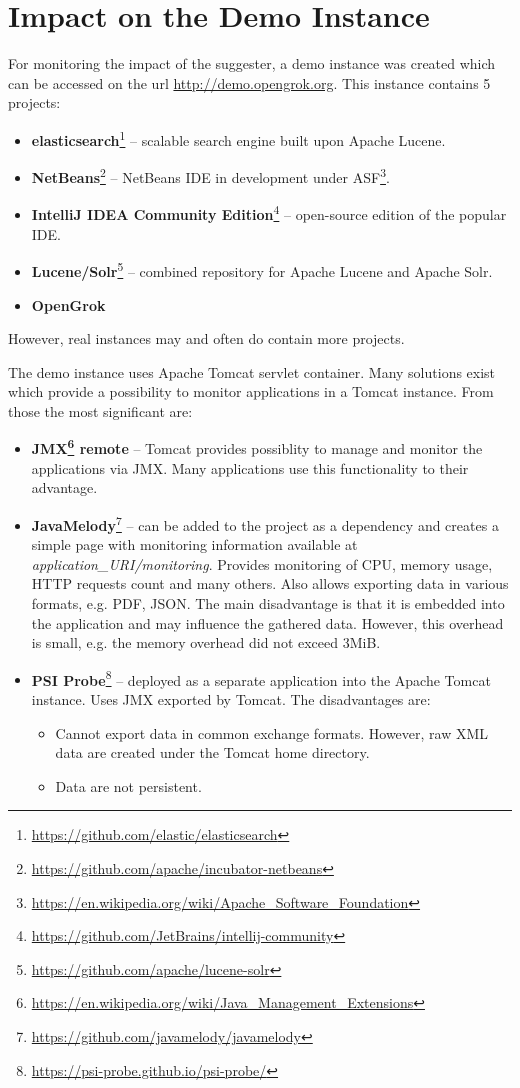 \section{Impact on the Demo Instance}
For monitoring the impact of the suggester, a demo instance was created which can be accessed on the url
\url{http://demo.opengrok.org}. This instance contains 5 projects:
\begin{itemize}
    \item \textbf{elasticsearch}\footnote{\url{https://github.com/elastic/elasticsearch}} – scalable search engine built
    upon Apache Lucene.
    \item \textbf{NetBeans}\footnote{\url{https://github.com/apache/incubator-netbeans}} – NetBeans IDE in development
    under ASF\footnote{\url{https://en.wikipedia.org/wiki/Apache\_Software\_Foundation}}.
    \item \textbf{IntelliJ IDEA Community Edition}\footnote{\url{https://github.com/JetBrains/intellij-community}} –
    open-source edition of the popular IDE.
    \item \textbf{Lucene/Solr}\footnote{\url{https://github.com/apache/lucene-solr}} – combined repository for Apache
    Lucene and Apache Solr.
    \item \textbf{OpenGrok}
\end{itemize}
However, real instances may and often do contain more projects.

The demo instance uses Apache Tomcat servlet container. Many solutions exist which provide a possibility to monitor
applications in a Tomcat instance. From those the most significant are:
\begin{itemize}
    \item \textbf{JMX\footnote{\url{https://en.wikipedia.org/wiki/Java\_Management\_Extensions}} remote} –
    Tomcat provides possiblity to manage and monitor the applications via JMX. Many applications use this functionality
    to their advantage.
    \item \textbf{JavaMelody}\footnote{\url{https://github.com/javamelody/javamelody}} – can be added to the project as a
    dependency and creates a simple page with monitoring information available at \textit{application\_URI/monitoring}.
    Provides monitoring of CPU, memory usage, HTTP requests count and many others. Also allows exporting data in
    various formats, e.g. PDF, JSON. The main disadvantage is that it is embedded into the application and may influence
    the gathered data. However, this overhead is small, e.g. the memory overhead did not exceed 3MiB.
    \item \textbf{PSI Probe}\footnote{\url{https://psi-probe.github.io/psi-probe/}} – deployed as a separate
    application into the Apache Tomcat instance. Uses JMX exported by Tomcat. The disadvantages are:
    \begin{itemize}
        \item Cannot export data in common exchange formats. However, raw XML data are created under the Tomcat
        home directory.
        \item Data are not persistent.
    \end{itemize}
\end{itemize}

